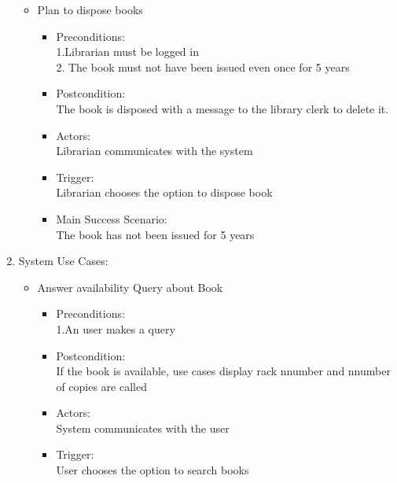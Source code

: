 \documentclass[a4paper]{article}
\begin{document}
\begin{enumerate}
\begin{itemize}
\item Plan to dispose books\\ 
 \begin{itemize}
  \item Preconditions:\\ 1.Librarian must be logged in\\ 2. The book must not have been issued even once for 5 years\\ 
 \item Postcondition:\\ The book is disposed with a message to the library clerk to delete it.\\ 
 \item Actors:\\  Librarian communicates with the system\\ 
 \item Trigger:\\  Librarian  chooses the option to dispose book\\ 
 \item Main Success Scenario:\\  The book has not been issued for 5 years\\ 
 \end{itemize}
 

\end{itemize}

\item System Use Cases:\\ 
 \begin{itemize}
 
  \item Answer availability Query about Book\\ 
	\begin{itemize}
	\item  Preconditions:\\ 1.An user makes a query\\ 
 \item Postcondition: \\ If the book is available, use cases display rack nnumber and nnumber of copies are called\\ 
 \item Actors:\\  System communicates with the user\\ 
 \item Trigger: \\ User chooses the option to search books\\ 
	\end{itemize}


\end{itemize}
\end{enumerate}
\end{document}
